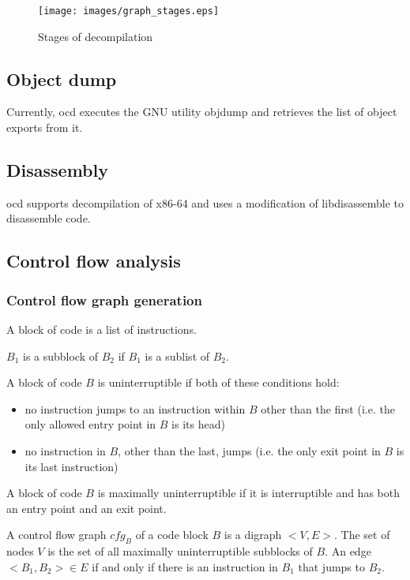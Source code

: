 \documentclass[leqno,11pt]{article}
\begin{document}
\begin{figure}[h!]
\texttt{[image: images/graph\_stages.eps]}
\centering
\caption{Stages of decompilation}
\label{fig:graph_stages}
\end{figure}

\subsection{Object dump}

Currently, ocd executes the GNU utility objdump and retrieves the list of object exports from it.

\subsection{Disassembly}

ocd supports decompilation of x86-64 and uses a modification of libdisassemble to disassemble code.

\subsection{Control flow analysis}

\subsubsection{Control flow graph generation}

\begin{definition}
A block of code is a list of instructions.
\end{definition}
\begin{definition}
$B_1$ is a subblock of $B_2$ if $B_1$ is a sublist of $B_2$.
\end{definition}
\begin{definition}
A block of code $B$ is uninterruptible if both of these conditions hold:
\begin{itemize}
 \item no instruction jumps to an instruction within $B$ other than the first (i.e. the only allowed entry point in $B$ is its head)
 \item no instruction in $B$, other than the last, jumps (i.e. the only exit point in $B$ is its last instruction)
\end{itemize}
\end{definition}
\begin{definition}
A block of code $B$ is maximally uninterruptible if it is interruptible and has both an entry point and an exit point.
\end{definition}
\begin{definition}
A control flow graph $cfg_B$ of a code block $B$ is a digraph $<V,E>$. The set of nodes $V$ is the set of all maximally uninterruptible subblocks of $B$. An edge $<B_1, B_2> \in E$ if and only if there is an instruction in $B_1$ that jumps to $B_2$.
\end{definition}
\end{document}
